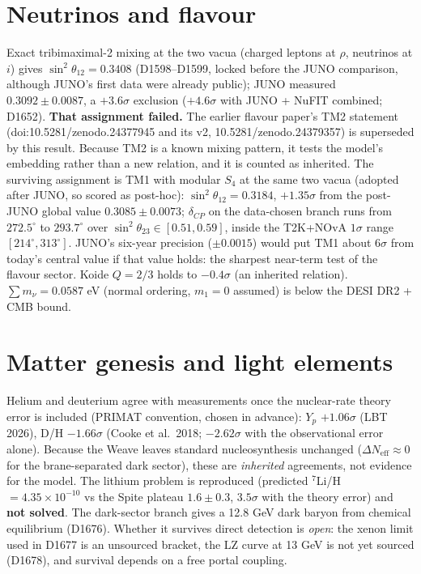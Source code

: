 \documentclass[11pt]{article}
\begin{document}
\section{Neutrinos and flavour}
Exact tribimaximal-2 mixing at the two vacua (charged leptons at $\rho$, neutrinos at $i$) gives $\sin^2\theta_{12}=0.3408$ (D1598--D1599, locked before the JUNO comparison, although JUNO's first data were already public); JUNO measured $0.3092\pm0.0087$, a $+3.6\sigma$ exclusion ($+4.6\sigma$ with JUNO + NuFIT combined; D1652). \textbf{That assignment failed.} The earlier flavour paper's TM2 statement (doi:10.5281/zenodo.24377945 and its v2, 10.5281/zenodo.24379357) is superseded by this result. Because TM2 is a known mixing pattern, it tests the model's embedding rather than a new relation, and it is counted as inherited. The surviving assignment is TM1 with modular $S_4$ at the same two vacua (adopted after JUNO, so scored as post-hoc): $\sin^2\theta_{12}=0.3184$, $+1.35\sigma$ from the post-JUNO global value $0.3085\pm0.0073$; $\delta_{CP}$ on the data-chosen branch runs from $272.5^\circ$ to $293.7^\circ$ over $\sin^2\theta_{23}\in[0.51,0.59]$, inside the T2K+NOvA $1\sigma$ range $[214^\circ,313^\circ]$. JUNO's six-year precision ($\pm0.0015$) would put TM1 about $6\sigma$ from today's central value if that value holds: the sharpest near-term test of the flavour sector. Koide $Q=2/3$ holds to $-0.4\sigma$ (an inherited relation). $\sum m_\nu=0.0587$ eV (normal ordering, $m_1=0$ assumed) is below the DESI DR2 + CMB bound.

\section{Matter genesis and light elements}
Helium and deuterium agree with measurements once the nuclear-rate theory error is included (PRIMAT convention, chosen in advance): $Y_p$ $+1.06\sigma$ (LBT 2026), D/H $-1.66\sigma$ (Cooke et al.\ 2018; $-2.62\sigma$ with the observational error alone). Because the Weave leaves standard nucleosynthesis unchanged ($\Delta N_\mathrm{eff}\approx0$ for the brane-separated dark sector), these are \emph{inherited} agreements, not evidence for the model. The lithium problem is reproduced (predicted $^7$Li/H $=4.35\times10^{-10}$ vs the Spite plateau $1.6\pm0.3$, $3.5\sigma$ with the theory error) and \textbf{not solved}. The dark-sector branch gives a 12.8 GeV dark baryon from chemical equilibrium (D1676). Whether it survives direct detection is \emph{open}: the xenon limit used in D1677 is an unsourced bracket, the LZ curve at 13 GeV is not yet sourced (D1678), and survival depends on a free portal coupling.
\end{document}
